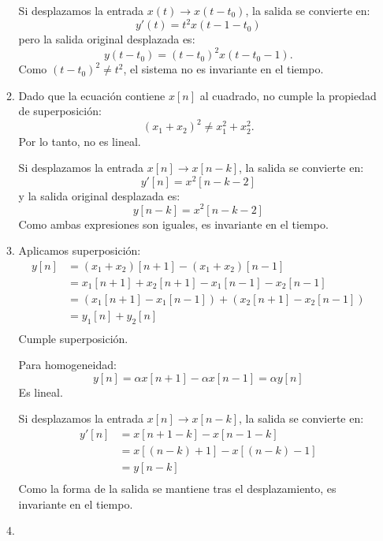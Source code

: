 \begin{enumerate}[label=\color{red}\textbf{\arabic*)}]
\begin{enumerate}[label=\color{red}\textbf{\alph*)}]
            Si desplazamos la entrada $x(t)\to x(t-t_0)$, la salida se convierte en: \[
            y'(t)=t^2x(t-1-t_0)
            \] pero la salida original desplazada es: \[
            y(t-t_0)=(t-t_0)^2x(t-t_0-1).
            \] 
            Como $(t-t_0)^2\neq t^2$, el sistema no es invariante en el tiempo.
        \item  {} 

            Dado que la ecuación contiene $x[n]$ al cuadrado, no cumple la propiedad de superposición:  \[
                (x_1+x_2)^2\neq x_1^2+x_2^2.
            \] 
            Por lo tanto, no es lineal.

            Si desplazamos la entrada $x[n]\to x[n-k]$, la salida se convierte en: \[
                y'[n]=x^2[n-k-2]
            \] y la salida original desplazada es: \[
            y[n-k]=x^2[n-k-2]
            \] 
            Como ambas expresiones son iguales, es invariante en el tiempo.
        \item {} 

            Aplicamos superposición: \[
            \begin{aligned}
                y[n]&= (x_1+x_2)[n+1]-(x_1+x_2)[n-1] \\
                    &= x_1[n+1]+x_2[n+1]-x_1[n-1]-x_2[n-1] \\
                    &= (x_1[n+1]-x_1[n-1])+(x_2[n+1]-x_2[n-1]) \\
                    &= y_1[n]+y_2[n] \\
            \end{aligned}
            \] 
            Cumple superposición.

            Para homogeneidad: \[
                y[n]=\alpha x[n+1]-\alpha x[n-1]=\alpha y[n]
            \] 
            Es lineal.

            Si desplazamos la entrada $x[n]\to x[n-k]$, la salida se convierte en: \[
           \begin{aligned}
               y'[n]&= x[n+1-k]-x[n-1-k] \\
                    &= x[(n-k)+1]-x[(n-k)-1] \\
                    &= y[n-k] \\
           \end{aligned} 
            \] 
            Como la forma de la salida se mantiene tras el desplazamiento, es invariante en el tiempo.
        \item {} 


\end{enumerate}
\end{enumerate}
